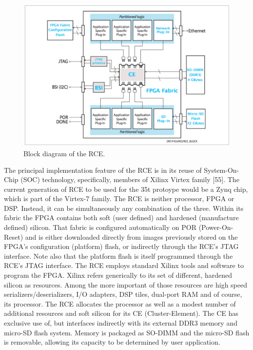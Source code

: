 \begin{figure}[tbh]
\includegraphics[scale=0.8]{rce-block.pdf}
\caption{Block diagram of the RCE.}
\label{fig:RCEblock}
\end{figure} 

The principal implementation feature of the RCE is in its reuse 
of System-On-Chip (SOC) technology, specifically, members of 
Xilinx Virtex family [55].
The current generation of RCE to be used for the 35t protoype would be 
a Zynq chip, which is part of the Virtex-7 family. 
The RCE is neither processor, FPGA or DSP. 
Instead, it can be simultaneously any combination of the three. 
Within its fabric the FPGA contains both soft (user defined) 
and hardened (manufacture defined) silicon. 
That fabric is configured automatically on POR (Power-On-Reset) 
and is either downloaded directly from images previously stored on the 
FPGA's configuration (platform) flash, or indirectly through the RCE's JTAG interface.
Note also that the platform flash is itself programmed through the RCE's 
JTAG interface. 
The RCE employs standard Xilinx tools and software to program the FPGA.
Xilinx refers generically to its set of different, hardened silicon as resources. 
Among the more important of those resources are high speed serializers/deserializers,
 I/O adapters, DSP tiles, dual-port RAM and of course, its processor. 
The RCE allocates the processor as well as a modest number of additional
 resources and soft silicon for its CE (Cluster-Element). 
The CE has exclusive use of, but interfaces indirectly with its external
DDR3 memory and micro-SD flash system. 
Memory is packaged as SO-DIMM and the micro-SD flash is removable, 
allowing its capacity to be determined by user application.

